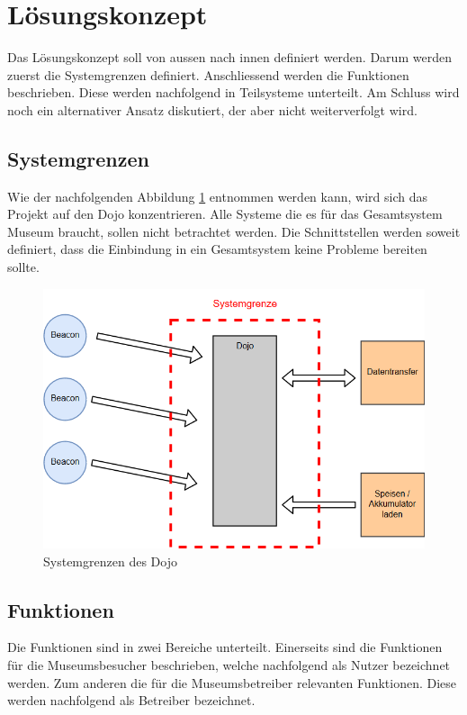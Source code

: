 \section{Lösungskonzept}
Das Lösungskonzept soll von aussen nach innen definiert werden. Darum werden zuerst die Systemgrenzen definiert. Anschliessend werden die Funktionen beschrieben. Diese werden nachfolgend in Teilsysteme unterteilt. Am Schluss wird noch ein alternativer Ansatz diskutiert, der aber nicht weiterverfolgt wird.

\subsection{Systemgrenzen}
Wie der nachfolgenden Abbildung \ref{fig:Systemgrenze} entnommen werden kann, wird sich das Projekt auf den Dojo konzentrieren. Alle Systeme die es für das Gesamtsystem Museum braucht, sollen nicht betrachtet werden. Die Schnittstellen werden soweit definiert, dass die Einbindung in ein Gesamtsystem keine Probleme bereiten sollte.

\begin{figure}[H]
\begin{center}
	\includegraphics[width=140mm]{data/Loesungskonzept_Systemgrenzen.png}
	\caption{Systemgrenzen des Dojo} %
	\label{fig:Systemgrenze}
\end{center}
\end{figure}

\subsection{Funktionen}
Die Funktionen sind in zwei Bereiche unterteilt. Einerseits sind die Funktionen für die Museumsbesucher beschrieben, welche nachfolgend als Nutzer bezeichnet werden. Zum anderen die für die Museumsbetreiber relevanten Funktionen. Diese werden nachfolgend als Betreiber bezeichnet.
